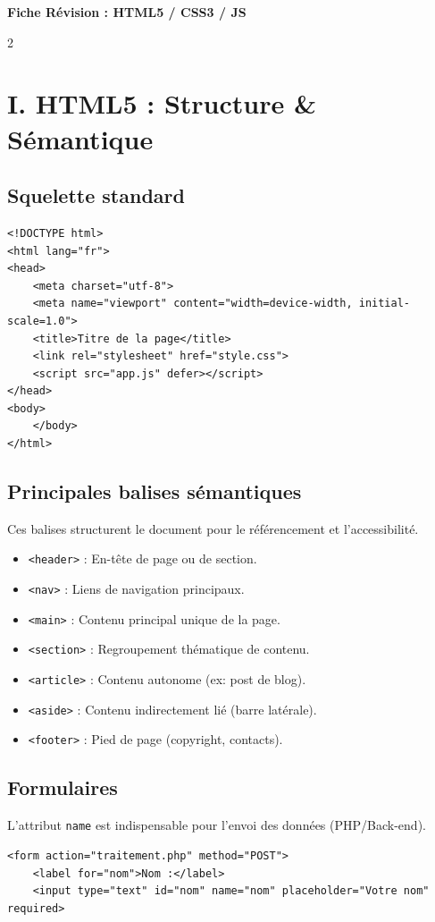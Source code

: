 \documentclass[11pt,a4paper]{article}
\begin{document}
\begin{center}
    {\Huge \textbf{Fiche Révision : HTML5 / CSS3 / JS}}
\end{center}

\begin{multicols*}{2}

\section{I. HTML5 : Structure \& Sémantique}

\subsection{Squelette standard}
\begin{lstlisting}
<!DOCTYPE html>
<html lang="fr">
<head>
    <meta charset="utf-8">
    <meta name="viewport" content="width=device-width, initial-scale=1.0">
    <title>Titre de la page</title>
    <link rel="stylesheet" href="style.css">
    <script src="app.js" defer></script>
</head>
<body>
    </body>
</html>
\end{lstlisting}

\subsection{Principales balises sémantiques}
Ces balises structurent le document pour le référencement et l'accessibilité.
\begin{itemize}
    \item \texttt{<header>} : En-tête de page ou de section.
    \item \texttt{<nav>} : Liens de navigation principaux.
    \item \texttt{<main>} : Contenu principal unique de la page.
    \item \texttt{<section>} : Regroupement thématique de contenu.
    \item \texttt{<article>} : Contenu autonome (ex: post de blog).
    \item \texttt{<aside>} : Contenu indirectement lié (barre latérale).
    \item \texttt{<footer>} : Pied de page (copyright, contacts).
\end{itemize}

\subsection{Formulaires}
L'attribut \texttt{name} est indispensable pour l'envoi des données (PHP/Back-end).
\begin{lstlisting}
<form action="traitement.php" method="POST">
    <label for="nom">Nom :</label>
    <input type="text" id="nom" name="nom" placeholder="Votre nom" required>


\end{lstlisting}
\end{multicols*}
\end{document}

